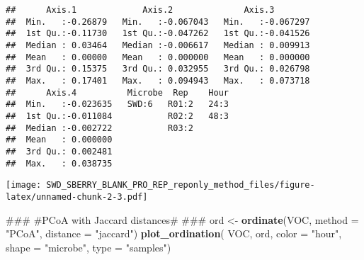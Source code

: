 \documentclass[]{article}
\newenvironment{Shaded}{\begin{snugshade}}{\end{snugshade}}
\newcommand{\KeywordTok}[1]{\textcolor[rgb]{0.13,0.29,0.53}{\textbf{#1}}}
\newcommand{\DataTypeTok}[1]{\textcolor[rgb]{0.13,0.29,0.53}{#1}}
\newcommand{\DecValTok}[1]{\textcolor[rgb]{0.00,0.00,0.81}{#1}}
\newcommand{\StringTok}[1]{\textcolor[rgb]{0.31,0.60,0.02}{#1}}
\newcommand{\OperatorTok}[1]{\textcolor[rgb]{0.81,0.36,0.00}{\textbf{#1}}}
\newcommand{\AlertTok}[1]{\textcolor[rgb]{0.94,0.16,0.16}{#1}}
\newcommand{\NormalTok}[1]{#1}
\begin{document}
\begin{verbatim}
##      Axis.1             Axis.2              Axis.3         
##  Min.   :-0.26879   Min.   :-0.067043   Min.   :-0.067297  
##  1st Qu.:-0.11730   1st Qu.:-0.047262   1st Qu.:-0.041526  
##  Median : 0.03464   Median :-0.006617   Median : 0.009913  
##  Mean   : 0.00000   Mean   : 0.000000   Mean   : 0.000000  
##  3rd Qu.: 0.15375   3rd Qu.: 0.032955   3rd Qu.: 0.026798  
##  Max.   : 0.17401   Max.   : 0.094943   Max.   : 0.073718  
##      Axis.4          Microbe  Rep    Hour  
##  Min.   :-0.023635   SWD:6   R01:2   24:3  
##  1st Qu.:-0.011084           R02:2   48:3  
##  Median :-0.002722           R03:2         
##  Mean   : 0.000000                         
##  3rd Qu.: 0.002481                         
##  Max.   : 0.038735
\end{verbatim}

\begin{Shaded}
\end{Shaded}

\texttt{[image: SWD\_SBERRY\_BLANK\_PRO\_REP\_reponly\_method\_files/figure-latex/unnamed-chunk-2-3.pdf]}

\begin{Shaded}
\begin{Highlighting}[]
\NormalTok{### #PCoA with Jaccard distances#   }\AlertTok{###}
\NormalTok{ord <-}\StringTok{ }\KeywordTok{ordinate}\NormalTok{(VOC, }\DataTypeTok{method =} \StringTok{"PCoA"}\NormalTok{, }\DataTypeTok{distance =} \StringTok{"jaccard"}\NormalTok{)}
\KeywordTok{plot_ordination}\NormalTok{( VOC, ord, }\DataTypeTok{color =} \StringTok{"hour"}\NormalTok{, }\DataTypeTok{shape =} \StringTok{"microbe"}\NormalTok{, }\DataTypeTok{type =} \StringTok{"samples"}\NormalTok{)}
\end{Highlighting}
\end{Shaded}
\end{document}
